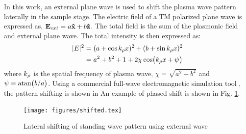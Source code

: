 \documentclass[11pt]{article}
\begin{document}
%
In this work, an external plane wave is used to shift the plasma wave pattern laterally in the sample stage. The electric field of a TM polarized plane wave is expressed as, $\mathbf{E}_{ext} = a \mathbf{\hat x} + b \mathbf{\hat z}$. The total field is the sum of the plasmonic field and external plane wave. The total intensity is then expressed as:
\begin{equation}
  \begin{split}
    \vert E \vert^2 &= (a + \cos k_{\rho}x)^2 + (b + \sin k_{\rho}x)^2 \\
    &=  a^2 + b^2 + 1 + 2 \chi \cos(k_{\rho}x + \psi)
  \end{split}
  \label{eq:shift}
\end{equation}
%
where $k_{\rho}$ is the spatial frequency of plasma wave, $\chi = \sqrt{a^2 + b^2}$ and $\psi = \atan (b/a)$. Using a commercial full-wave electromagnetic simulation tool \cite{comsol}, the pattern shifting is shown in An example of phased shift is shown in Fig. \ref{fig:shift}.
%
\begin{figure}[h]
  \begin{center}
    \noindent
    \texttt{[image: figures/shifted.tex]}
    \caption{Lateral shifting of standing wave pattern using external wave}
    \label{fig:shift}
  \end{center}
\end{figure}
%
\end{document}
